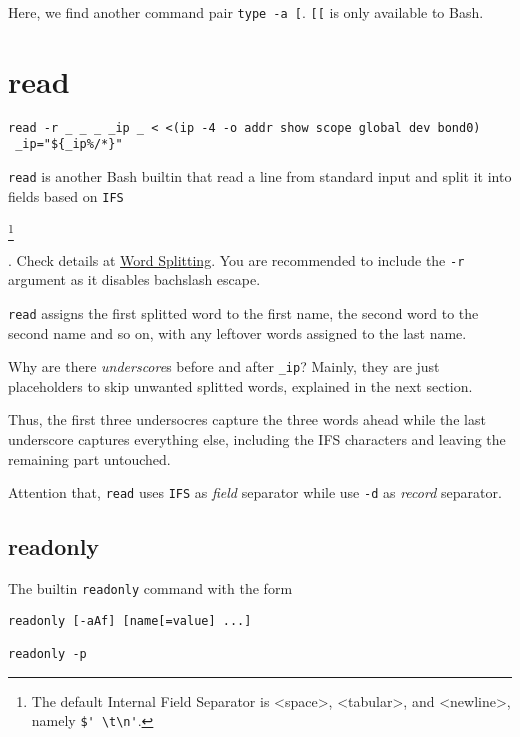 Here, we find another command pair \lstinline|type -a [|.
\lstinline|[[| is only available to Bash.

\section{read}
\label{sec:bash-read}

\begin{lstlisting}
read -r _ _ _ _ip _ < <(ip -4 -o addr show scope global dev bond0)
 _ip="${_ip%/*}"
\end{lstlisting}

\lstinline|read| is another Bash builtin that read a line from
standard input and split it into fields based on \lstinline|IFS|
\begin{cprotect}
  \footnote{The default Internal Field Separator is <space>,
    <tabular>, and <newline>, namely \lstinline|$' \t\n'|.}
\end{cprotect}. Check details at
\href{https://www.gnu.org/software/bash/manual/bash.html#Word-Splitting}{Word
  Splitting}. You are recommended to include the \lstinline|-r|
argument as it disables bachslash escape.

\lstinline|read| assigns the first splitted word to the first
name, the second word to the second name and so on, with any
leftover words assigned to the last name.

Why are there \textit{underscore}s before and after
\lstinline|_ip|? Mainly, they are just placeholders to skip
unwanted splitted words, explained in the next section.

Thus, the first three undersocres capture the three words
ahead while the last underscore captures everything else, including the
IFS characters and leaving the remaining part untouched.

Attention that, \lstinline|read| uses \verb|IFS| as \textit{field}
separator while use \lstinline|-d| as \textit{record} separator.

\subsection{readonly}
\label{sec:bash-readonly}

The builtin \lstinline|readonly| command with the form

\begin{lstlisting}
readonly [-aAf] [name[=value] ...]

readonly -p
\end{lstlisting}

